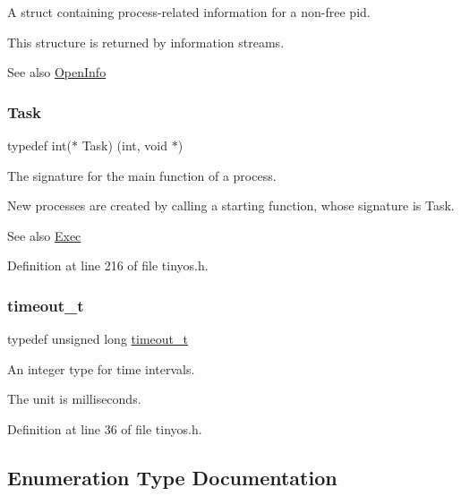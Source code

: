A struct containing process-\/related information for a non-\/free pid. 

This structure is returned by information streams. \begin{DoxySeeAlso}{See also}
\hyperlink{group__syscalls_gaf326b11574cdc84a9e21b9d860076821}{Open\+Info} 
\end{DoxySeeAlso}
\mbox{\label{group__syscalls_gaec3f2f835e105271fbbc00272c0ba984}} 
\subsubsection{\texorpdfstring{Task}{Task}}
{\footnotesize\ttfamily typedef int($\ast$ Task) (int, void $\ast$)}



The signature for the main function of a process. 

New processes are created by calling a starting function, whose signature is Task. \begin{DoxySeeAlso}{See also}
\hyperlink{group__syscalls_ga737ad30d8105b4b76e3eb102dd016404}{Exec} 
\end{DoxySeeAlso}


Definition at line 216 of file tinyos.\+h.

\mbox{\label{group__syscalls_gaf412159e5cef839836a5e7b19ee75d1c}} 
\subsubsection{\texorpdfstring{timeout\+\_\+t}{timeout\_t}}
{\footnotesize\ttfamily typedef unsigned long \hyperlink{group__syscalls_gaf412159e5cef839836a5e7b19ee75d1c}{timeout\+\_\+t}}



An integer type for time intervals. 

The unit is milliseconds. 

Definition at line 36 of file tinyos.\+h.



\subsection{Enumeration Type Documentation}
\mbox{\label{group__syscalls_ga9eb10a0a72ca3149140272e9344a272b}} 
